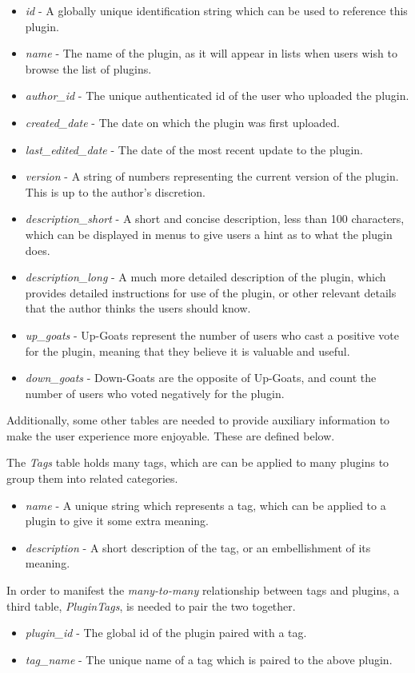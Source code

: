 \documentclass[a4paper, 12pt]{article}
\begin{document}
	\begin{itemize}
		\item \emph{id} - A globally unique identification string which can be used to reference this plugin.
		\item \emph{name} - The name of the plugin, as it will appear in lists when users wish to browse the list of plugins.
		\item \emph{author\_id} - The unique authenticated id of the user who uploaded the plugin.
		\item \emph{created\_date} - The date on which the plugin was first uploaded.
		\item \emph{last\_edited\_date} - The date of the most recent update to the plugin.
		\item \emph{version} - A string of numbers representing the current version of the plugin. This is up to the author's discretion.
		\item \emph{description\_short} - A short and concise description, less than 100 characters, which can be displayed in menus to give users a hint as to what the plugin does.
		\item \emph{description\_long} - A much more detailed description of the plugin, which provides detailed instructions for use of the plugin, or other relevant details that the author thinks the users should know.
		\item \emph{up\_goats} - Up-Goats represent the number of users who cast a positive vote for the plugin, meaning that they believe it is valuable and useful.
		\item \emph{down\_goats} - Down-Goats are the opposite of Up-Goats, and count the number of users who voted negatively for the plugin.
	\end{itemize}

	Additionally, some other tables are needed to provide auxiliary information to make the user experience more enjoyable. These are defined below.

	The \emph{Tags} table holds many tags, which are can be applied to many plugins to group them into related categories.

	\begin{itemize}
		\item \emph{name} - A unique string which represents a tag, which can be applied to a plugin to give it some extra meaning.
		\item \emph{description} - A short description of the tag, or an embellishment of its meaning.
	\end{itemize}

	In order to manifest the \emph{many-to-many} relationship between tags and plugins, a third table, \emph{PluginTags}, is needed to pair the two together.

	\begin{itemize}
		\item \emph{plugin\_id} - The global id of the plugin paired with a tag.
		\item \emph{tag\_name} - The unique name of a tag which is paired to the above plugin.
	\end{itemize}
\end{document}
